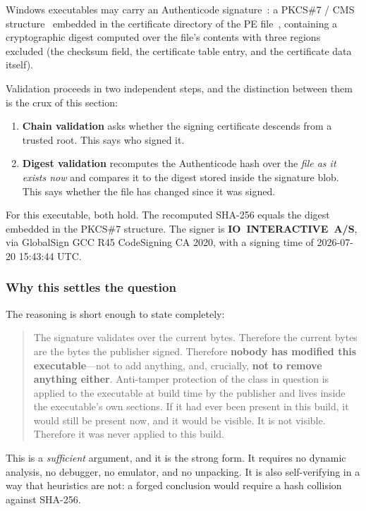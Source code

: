 Windows executables may carry an Authenticode signature~\cite{authenticode}: a
PKCS\#7 / CMS structure~\cite{rfc5652} embedded in the certificate directory of
the PE file~\cite{pecoff}, containing a cryptographic digest computed over the
file's contents with three regions excluded (the checksum field, the certificate
table entry, and the certificate data itself).

Validation proceeds in two independent steps, and the distinction between them is
the crux of this section:

\begin{enumerate}
\item \textbf{Chain validation} asks whether the signing certificate descends
      from a trusted root. This says who signed it.
\item \textbf{Digest validation} recomputes the Authenticode hash over the
      \emph{file as it exists now} and compares it to the digest stored inside
      the signature blob. This says whether the file has changed since it was
      signed.
\end{enumerate}

For this executable, both hold. The recomputed SHA-256 equals the digest embedded
in the PKCS\#7 structure. The signer is \textbf{IO~INTERACTIVE~A/S}, via
GlobalSign GCC R45 CodeSigning CA 2020, with a signing time of
2026-07-20 15:43:44 UTC.

\subsubsection{Why this settles the question}

The reasoning is short enough to state completely:

\begin{quote}
The signature validates over the current bytes. Therefore the current bytes are
the bytes the publisher signed. Therefore \textbf{nobody has modified this
executable}---not to add anything, and, crucially, \textbf{not to remove
anything either}. Anti-tamper protection of the class in question is applied to
the executable at build time by the publisher and lives inside the executable's
own sections. If it had ever been present in this build, it would still be
present now, and it would be visible. It is not visible. Therefore it was never
applied to this build.
\end{quote}

This is a \emph{sufficient} argument, and it is the strong form. It requires no
dynamic analysis, no debugger, no emulator, and no unpacking. It is also
self-verifying in a way that heuristics are not: a forged conclusion would
require a hash collision against SHA-256.

